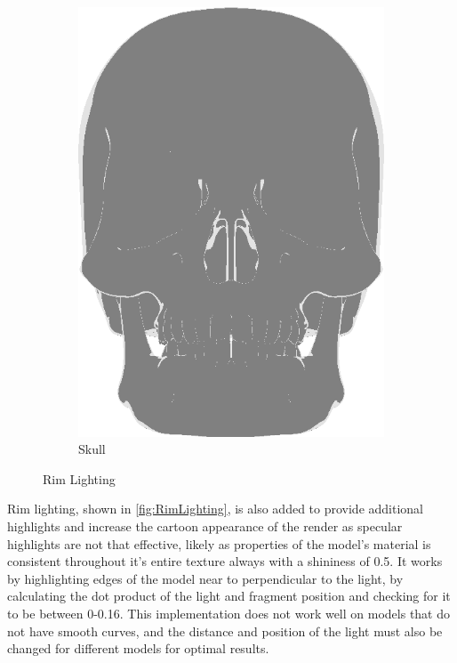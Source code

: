 \begin{figure}[h]
\begin{subfigure}[b]{0.22\textwidth}
    \includegraphics[width=\textwidth]{img/Lighting/RimSkull.png}
    \caption{Skull}
    \label{fig:RimSkull}
\end{subfigure}
\caption{Rim Lighting}
\label{fig:RimLighting}
\end{figure}

Rim lighting, shown in \autoref{fig:RimLighting}, is also added to provide additional highlights and increase the cartoon appearance 
of the render as specular highlights are not that effective, likely as properties of the model's 
material is consistent throughout it's entire texture always with a shininess of 0.5. It works by 
highlighting edges of the model near to perpendicular to the light, by calculating the dot product 
of the light and fragment position and checking for it to be between 0-0.16. This implementation 
does not work well on  models that do not have smooth curves, and the distance and position of the 
light must also be changed for different models for optimal results. 

